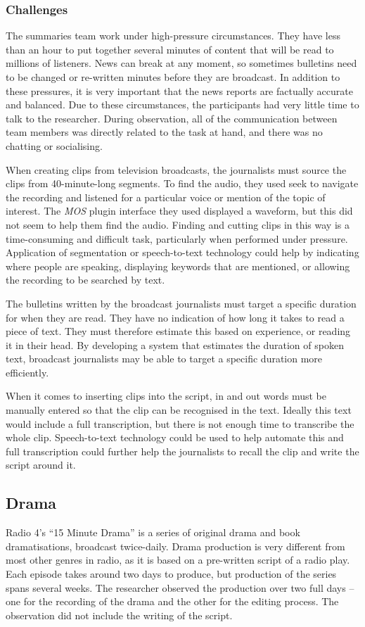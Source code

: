 \subsubsection{Challenges}

The summaries team work under high-pressure circumstances. They have less than an hour to put together several minutes
of content that will be read to millions of listeners. News can break at any moment, so sometimes bulletins need to be
changed or re-written minutes before they are broadcast. In addition to these pressures, it is very important that the
news reports are factually accurate and balanced.  Due to these circumstances, the participants had very little time to
talk to the researcher. During observation, all of the communication between team members was directly related to the
task at hand, and there was no chatting or socialising.

When creating clips from television broadcasts, the journalists must source the clips from 40-minute-long segments.  To
find the audio, they used seek to navigate the recording and listened for a particular voice or mention of the topic of
interest.  The \textit{MOS} plugin interface they used displayed a waveform, but this did not seem to help them find
the audio.  Finding and cutting clips in this way is a time-consuming and difficult task, particularly when performed
under pressure.  Application of segmentation or speech-to-text technology could help by indicating where people are
speaking, displaying keywords that are mentioned, or allowing the recording to be searched by text.

The bulletins written by the broadcast journalists must target a specific duration for when they are read.  They have
no indication of how long it takes to read a piece of text. They must therefore estimate this based on experience, or
reading it in their head.  By developing a system that estimates the duration of spoken text, broadcast journalists may
be able to target a specific duration more efficiently. 

When it comes to inserting clips into the script, in and out words must be manually entered so that the clip can be
recognised in the text. Ideally this text would include a full transcription, but there is not enough time to
transcribe the whole clip.  Speech-to-text technology could be used to help automate this and full transcription could
further help the journalists to recall the clip and write the script around it.

\subsection{Drama}\label{sec:drama}
Radio 4's ``15 Minute Drama'' is a series of original drama and book dramatisations, broadcast twice-daily. Drama
production is very different from most other genres in radio, as it is based on a pre-written script of a radio play.
Each episode takes around two days to produce, but production of the series spans several weeks.  The researcher
observed the production over two full days -- one for the recording of the drama and the other for the editing process.
The observation did not include the writing of the script.

